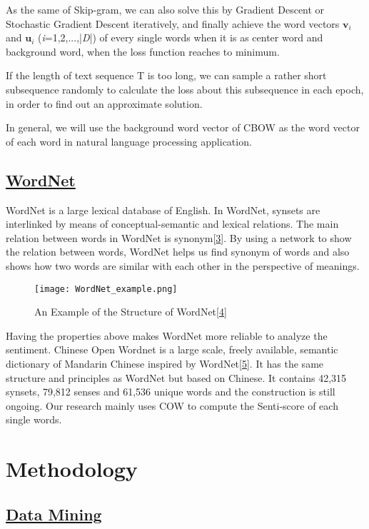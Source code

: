 \documentclass[10pt, conference, compsocconf]{IEEEtran}
\begin{document}
As the same of Skip-gram, we can also solve this by Gradient Descent or Stochastic Gradient Descent iteratively, and finally achieve the word vectors $\textbf{v}_{i}$ and $\textbf{u}_{i}$ (\textit{i}=1,2,...,\big|\textit{D}\big|) of every single words when it is as center word and background word, when the loss function reaches to minimum.

If the length of text sequence T is too long, we can sample a rather short subsequence randomly to calculate the loss about this subsequence in each epoch, in order to find out an approximate solution.

In general, we will use the background word vector of CBOW as the word vector of each word in natural language processing application.

\vspace{0.5cm}
\subsection{\underline{WordNet}}

WordNet is a large lexical database of English. In WordNet, synsets are interlinked by means of conceptual-semantic and lexical relations. The main relation between words in WordNet is synonym[\hyperref[ref 3]{3}]. By using a network to show the relation between words, WordNet helps us find synonym of words and also shows how two words are similar with each other in the perspective of meanings.

\begin{figure}[ht]
\centering
\texttt{[image: WordNet\_example.png]}
\caption{An Example of the Structure of WordNet[\hyperref[ref 4]{4}]}
\end{figure}

Having the properties above makes WordNet more reliable to analyze the sentiment. Chinese Open Wordnet is a large scale, freely available, semantic dictionary of Mandarin Chinese inspired by WordNet[\hyperref[ref 5]{5}]. It has the same structure and principles as WordNet but based on Chinese. It contains 42,315 synsets, 79,812 senses and 61,536 unique words and the construction is still ongoing. Our research mainly uses COW to compute the Senti-score of each single words.

\section{Methodology}
\subsection{\underline{Data Mining}}
\end{document}
